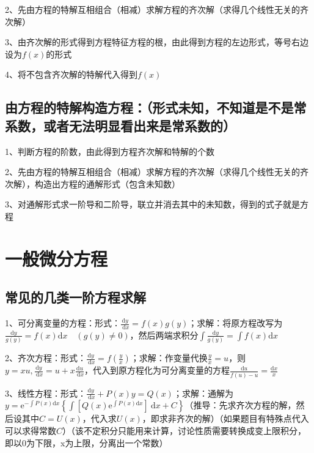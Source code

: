 2、先由方程的特解互相组合（相减）求解方程的齐次解（求得几个线性无关的齐次解）

3、由齐次解的形式得到方程特征方程的根，由此得到方程的左边形式，等号右边设为$f(x)$的形式

4、将不包含齐次解的特解代入得到$f(x)$



\subsection{由方程的特解构造方程：（形式未知，不知道是不是常系数，或者无法明显看出来是常系数的）}

1、判断方程的阶数，由此得到方程齐次解和特解的个数

2、先由方程的特解互相组合（相减）求解方程的齐次解（求得几个线性无关的齐次解），构造出方程的通解形式（包含未知数）

3、对通解形式求一阶导和二阶导，联立并消去其中的未知数，得到的式子就是方程

\section{一般微分方程}



\subsection{常见的几类一阶方程求解}

1、可分离变量的方程：形式：$\frac{\mathrm{d} y}{\mathrm{~d} x}=f(x) g(y)$；求解：将原方程改写为$\frac{\mathrm{d} y}{g(y)}=f(x) \mathrm{d} x \quad(g(y) \neq 0)$，然后两端求积分$\int \frac{\mathrm{d} y}{g(y)}=\int f(x) \mathrm{d} x$

2、齐次方程：形式：$\frac{\mathrm{d} y}{\mathrm{~d} x}=f\left(\frac{y}{x}\right)$；求解：作变量代换$\frac{y}{x}=u$，则$y=x u, \frac{\mathrm{d} y}{\mathrm{~d} x}=u+x \frac{\mathrm{d} u}{\mathrm{~d} x}$，代入到原方程化为可分离变量的方程$\frac{\mathrm{d} u}{f(u)-u}=\frac{\mathrm{d} x}{x}$

3、线性方程：形式：$\frac{\mathrm{d} y}{\mathrm{~d} x}+P(x) y=Q(x)$；求解：通解为$y=\mathrm{e}^{-\int P(x) \mathrm{d} x}\left\{\int \left[Q(x) \mathrm{e}^{\int P(x) \mathrm{d} x} \right]\mathrm{~d} x+C\right\}$（推导：先求齐次方程的解，然后设其中$C=U(x)$，代入求$U(x)$，即求非齐次的解）（如果题目有特殊点代入可以求得常数$C$）（该不定积分只能用来计算，讨论性质需要转换成变上限积分，即以0为下限，x为上限，分离出一个常数）

